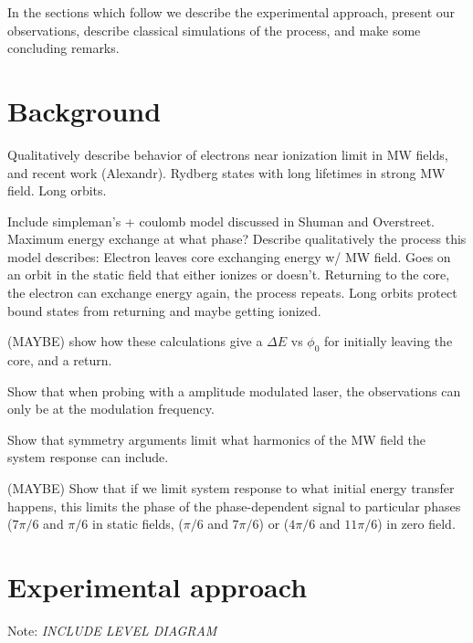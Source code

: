 \documentclass[aps,pra,preprint,groupedaddress]{revtex4-1}
\begin{document}
In the sections which follow we describe the experimental approach, present our observations, describe classical simulations of the process, and make some concluding remarks.


\section{\label{sec:back} Background}

Qualitatively describe behavior of electrons near ionization limit in MW fields, and recent work (Alexandr). Rydberg states with long lifetimes in strong MW field. Long orbits.

Include simpleman's + coulomb model discussed in Shuman and Overstreet. Maximum energy exchange at what phase? Describe qualitatively the process this model describes: Electron leaves core exchanging energy w/ MW field. Goes on an orbit in the static field that either ionizes or doesn't. Returning to the core, the electron can exchange energy again, the process repeats. Long orbits protect bound states from returning and maybe getting ionized.

(MAYBE) show how these calculations give a $\Delta E$ vs $\phi_0$ for initially leaving the core, and a return.

Show that when probing with a amplitude modulated laser, the observations can only be at the modulation frequency.

Show that symmetry arguments limit what harmonics of the MW field the system response can include.

(MAYBE) Show that if we limit system response to what initial energy transfer happens, this limits the phase of the phase-dependent signal to particular phases ($7\pi/6$ and $\pi/6$ in static fields, ($\pi/6$ and $7\pi/6$) or ($4\pi/6$ and $11\pi/6$) in zero field.

\section{\label{sec:exp} Experimental approach}

Note: \emph{INCLUDE LEVEL DIAGRAM}
\end{document}

